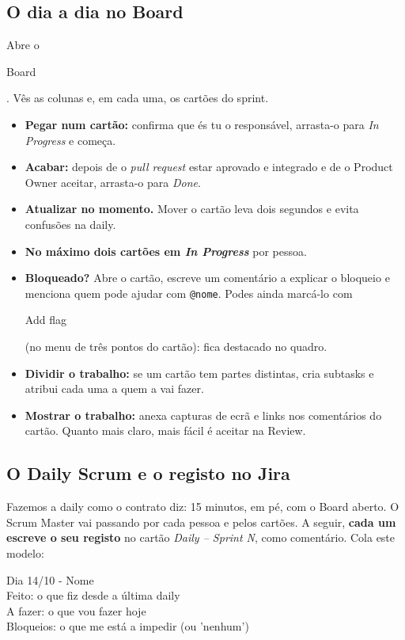 \documentclass[11pt,a4paper]{article}
\newcommand{\btn}[1]{{\setlength{\fboxsep}{1.6pt}\colorbox{azulclaro}{\sffamily\small\strut #1}}}
\begin{document}
\subsection{O dia a dia no Board}

Abre o \btn{Board}. Vês as colunas e, em cada uma, os cartões do sprint.

\begin{itemize}
  \item \textbf{Pegar num cartão:} confirma que és tu o responsável, arrasta-o para \textit{In Progress} e começa.
  \item \textbf{Acabar:} depois de o \textit{pull request} estar aprovado e integrado e de o Product Owner aceitar, arrasta-o para \textit{Done}.
  \item \textbf{Atualizar no momento.} Mover o cartão leva dois segundos e evita confusões na daily.
  \item \textbf{No máximo dois cartões em \textit{In Progress}} por pessoa.
  \item \textbf{Bloqueado?} Abre o cartão, escreve um comentário a explicar o bloqueio e menciona quem pode ajudar com \texttt{@nome}. Podes ainda marcá-lo com \btn{Add flag} (no menu de três pontos do cartão): fica destacado no quadro.
  \item \textbf{Dividir o trabalho:} se um cartão tem partes distintas, cria subtasks e atribui cada uma a quem a vai fazer.
  \item \textbf{Mostrar o trabalho:} anexa capturas de ecrã e links nos comentários do cartão. Quanto mais claro, mais fácil é aceitar na Review.
\end{itemize}

\subsection{O Daily Scrum e o registo no Jira}

Fazemos a daily como o contrato diz: 15 minutos, em pé, com o Board aberto. O Scrum Master vai passando por cada pessoa e pelos cartões. A seguir, \textbf{cada um escreve o seu registo} no cartão \textit{Daily – Sprint N}, como comentário. Cola este modelo:

\begin{codigo}
Dia 14/10 - Nome\\
Feito: o que fiz desde a última daily\\
A fazer: o que vou fazer hoje\\
Bloqueios: o que me está a impedir (ou 'nenhum')
\end{codigo}
\end{document}
